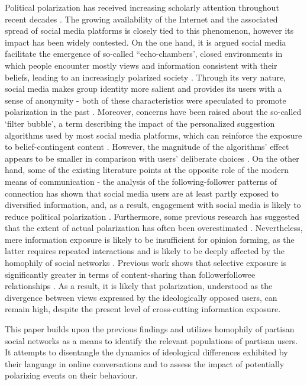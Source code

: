 \documentclass{article}
\begin{document}
	Political polarization has received increasing scholarly attention throughout recent decades \citep{lukianoff2018, tucker2018, sunstein2018}.  The growing availability of the Internet and the associated spread of social media platforms is closely tied to this phenomenon, however its impact has been widely contested. On the one hand, it is argued social media facilitate the emergence of so-called “echo-chambers', closed environments in which people encounter mostly views and information consistent with their beliefs, leading to an increasingly polarized society \citep{prior2007}. Through its very nature, social media makes group identity more salient and provides its users with a sense of anonymity - both of these characteristics were speculated to promote polarization in the past \citep{sunstein2002}. Moreover, concerns have been raised about the so-called ‘filter bubble’, a term describing the impact of the personalized suggestion algorithms used by most social media platforms, which can reinforce the exposure to belief-contingent content \citep{pariser2009}. However, the magnitude of the algorithms’ effect appears to be smaller in comparison with users’ deliberate choices \citep{bakshy2015}. On the other hand, some of the existing literature points at the opposite role of the modern means of communication - the analysis of the following-follower patterns of connection has shown that social media users are at least partly exposed to diversified information, and, as a result, engagement with social media is likely to reduce political polarization \citep{barbera2015_2, barbera2015_1}. Furthermore, some previous research has suggested that the extent of actual polarization has often been overestimated \citep{westfall2015}. Nevertheless, mere information exposure is likely to be insufficient for opinion forming, as the latter requires repeated interactions and is likely to be deeply affected by the homophily of social networks \citep[][pp. 192]{jackson2020}. Previous work shows that selective exposure is significantly greater in terms of content-sharing than follower\-followee relationships \citep{ogawaetal2013}. As a result, it is likely that polarization, understood as the divergence between views expressed by the ideologically opposed users, can remain high, despite the present level of cross-cutting information exposure.   
	
	This paper builds upon the previous findings and utilizes homophily of partisan social networks as a means to identify the relevant populations of partisan users. It attempts to disentangle the dynamics of ideological differences exhibited by their language in online conversations and to assess the impact of potentially polarizing events on their behaviour.
	
\end{document}
